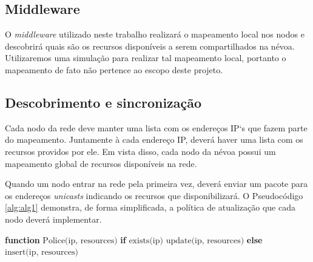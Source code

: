 \subsection{Middleware}

O \textit{middleware} utilizado neste trabalho realizará o mapeamento local nos nodos e descobrirá quais são os recursos disponíveis a serem compartilhados na névoa.
Utilizaremos uma simulação para realizar tal mapeamento local, portanto o mapeamento de fato não pertence ao escopo deste projeto.


\subsection{Descobrimento e sincronização}

Cada nodo da rede deve manter uma lista com os endereços IP`s que fazem parte do mapeamento. Juntamente à cada endereço IP, deverá haver uma lista com os recursos providos por ele.
Em vista disso, cada nodo da névoa possui um mapeamento global de recursos disponíveis na rede.

Quando um nodo entrar na rede pela primeira vez, deverá enviar um pacote para os endereços \textit{unicasts} indicando os recursos que disponibilizará.
O Pseudocódigo \ref{alg:alg1} demonstra, de forma simplificada, a política de atualização que cada nodo deverá implementar.


\begin{algorithm}[htb]
    \begin{center}
        \begin{algorithmic}[1]
            \STATE \textbf{function} $\text{Police(ip, resources)}$
            \STATE \hspace{\algorithmicindent} \textbf{if} $\text{exists(ip)}$
            \STATE \hspace{\algorithmicindent} \hspace{\algorithmicindent} $\text{update(ip, resources)}$
            \STATE \hspace{\algorithmicindent} \textbf{else}
            \STATE \hspace{\algorithmicindent} \hspace{\algorithmicindent} $\text{insert(ip, resources)}$
        \end{algorithmic}
    \end{center}
    \caption[Política de atualização de recursos]%
        {\label{alg:alg1} Política de atualização de recursos.}%
    \end{algorithm}



